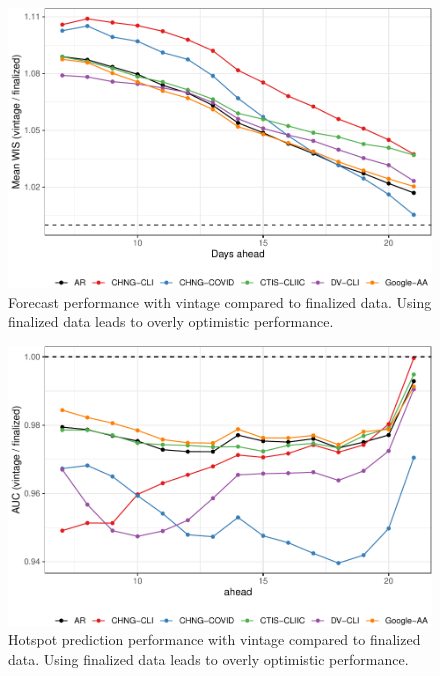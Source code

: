 \documentclass[9pt,twoside,lineno]{pnas-new}
\begin{document}
\clearpage

\begin{figure}

{\centering \includegraphics[width=\textwidth]{fig/fcast-honest-v-finalized-1} 

}

\caption{Forecast performance with vintage compared to finalized data. Using finalized data leads to overly optimistic performance.}\label{fig:fcast-honest-v-finalized}
\end{figure}

\clearpage

\begin{figure}

{\centering \includegraphics[width=\textwidth]{fig/hot-honest-v-finalized-1} 

}

\caption{Hotspot prediction performance with vintage compared to finalized data. Using finalized data leads to overly optimistic performance.}\label{fig:hot-honest-v-finalized}
\end{figure}
\end{document}
